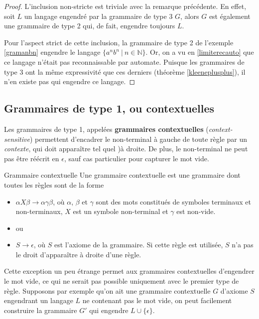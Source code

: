 \begin{proof}
L'inclusion non-stricte est triviale avec la remarque précédente. En effet, soit $L$ un langage engendré par la grammaire de type 3 $G$, alors $G$ est également une grammaire de type 2 qui, de fait, engendre toujours $L$.

Pour l'aspect strict de cette inclusion, la grammaire de type 2 de l'exemple \ref{gramanbn} engendre le langage $\{a^nb^n ~|~ n \in \mathbb{N}\}$. Or, on a vu en \ref{limiterecauto} que ce langage n'était pas reconnaissable par automate. Puisque les grammaires de type 3 ont la même expressivité que ces derniers (théorème \ref{kleeneplusplus}), il n'en existe pas qui engendre ce langage.
\end{proof}




\subsection{Grammaires de type 1, ou contextuelles}

Les grammaires de type 1, appelées \textbf{grammaires contextuelles} (\textit{context-sensitive}) permettent d'encadrer le non-terminal à gauche de toute règle par un \textit{contexte}, qui doit apparaître tel quel )à droite. De plus, le non-terminal ne peut pas être réécrit en $\epsilon$, sauf cas particulier pour capturer le mot vide.

\begin{definition}{Grammaire contextuelle}{}
Une grammaire contextuelle est une grammaire dont toutes les règles sont de la forme 
\begin{itemize}
\item[] $\alpha X \beta \rightarrow \alpha \gamma \beta$, où $\alpha$, $\beta$ et $\gamma$ sont des mots constitués de symboles terminaux et non-terminaux, $X$ est un symbole non-terminal et $\gamma$ est non-vide. 
\item[] ou
\item[] $S \rightarrow \epsilon$, où $S$ est l'axiome de la grammaire. Si cette règle est utilisée, $S$ n'a pas le droit d'apparaître à droite d'une règle.
\end{itemize}

\end{definition}

Cette exception un peu étrange permet aux grammaires contextuelles d'engendrer le mot vide, ce qui ne serait pas possible uniquement avec le premier type de règle. Supposons par exemple qu'on ait une grammaire contextuelle $G$ d'axiome $S$ engendrant un langage $L$ ne contenant pas le mot vide, on peut facilement construire la grammaire $G'$ qui engendre $L \cup \{\epsilon\}$. 

